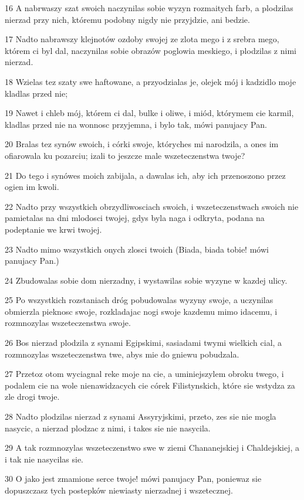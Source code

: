 \par 16 A nabrwaszy szat swoich naczynilas sobie wyzyn rozmaitych farb, a plodzilas nierzad przy nich, któremu podobny nigdy nie przyjdzie, ani bedzie.
\par 17 Nadto nabrawszy klejnotów ozdoby swojej ze zlota mego i z srebra mego, którem ci byl dal, naczynilas sobie obrazów poglowia meskiego, i plodzilas z nimi nierzad.
\par 18 Wzielas tez szaty swe haftowane, a przyodzialas je, olejek mój i kadzidlo moje kladlas przed nie;
\par 19 Nawet i chleb mój, którem ci dal, bulke i oliwe, i miód, którymem cie karmil, kladlas przed nie na wonnosc przyjemna, i bylo tak, mówi panujacy Pan.
\par 20 Bralas tez synów swoich, i córki swoje, któryches mi narodzila, a ones im ofiarowala ku pozarciu; izali to jeszcze male wszeteczenstwa twoje?
\par 21 Do tego i synówes moich zabijala, a dawalas ich, aby ich przenoszono przez ogien im kwoli.
\par 22 Nadto przy wszystkich obrzydliwosciach swoich, i wszeteczenstwach swoich nie pamietalas na dni mlodosci twojej, gdys byla naga i odkryta, podana na podeptanie we krwi twojej.
\par 23 Nadto mimo wszystkich onych zlosci twoich (Biada, biada tobie! mówi panujacy Pan.)
\par 24 Zbudowalas sobie dom nierzadny, i wystawilas sobie wyzyne w kazdej ulicy.
\par 25 Po wszystkich rozstaniach dróg pobudowalas wyzyny swoje, a uczynilas obmierzla pieknosc swoje, rozkladajac nogi swoje kazdemu mimo idacemu, i rozmnozylas wszeteczenstwa swoje.
\par 26 Bos nierzad plodzila z synami Egipskimi, sasiadami twymi wielkich cial, a rozmnozylas wszeteczenstwa twe, abys mie do gniewu pobudzala.
\par 27 Przetoz otom wyciagnal reke moje na cie, a uminiejszylem obroku twego, i podalem cie na wole nienawidzacych cie córek Filistynskich, które sie wstydza za zle drogi twoje.
\par 28 Nadto plodzilas nierzad z synami Assyryjskimi, przeto, zes sie nie mogla nasycic, a nierzad plodzac z nimi, i takes sie nie nasycila.
\par 29 A tak rozmnozylas wszeteczenstwo swe w ziemi Chananejskiej i Chaldejskiej, a i tak nie nasycilas sie.
\par 30 O jako jest zmamione serce twoje! mówi panujacy Pan, poniewaz sie dopuszczasz tych postepków niewiasty nierzadnej i wszetecznej.
